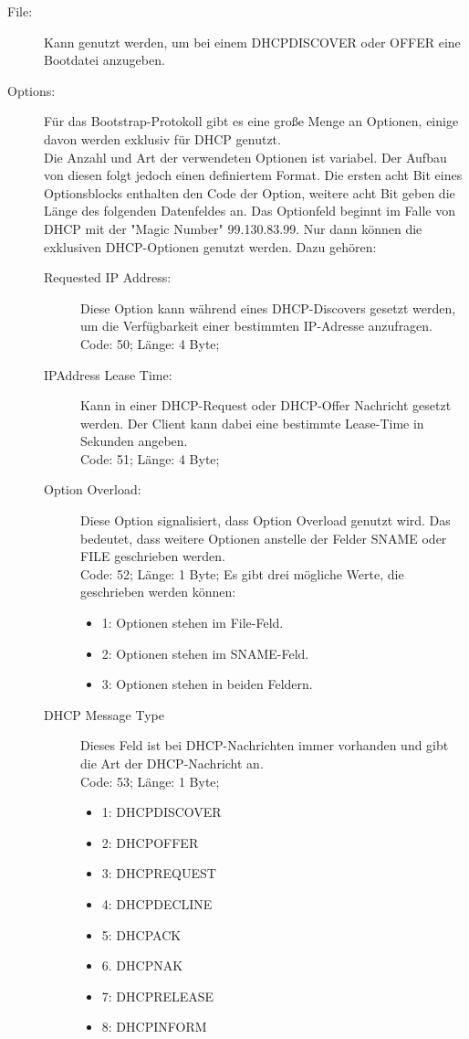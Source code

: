 \begin{description}
\item[File: ] Kann genutzt werden, um bei einem DHCPDISCOVER oder OFFER eine Bootdatei anzugeben. 
\item[Options: ] Für das Bootstrap-Protokoll gibt es eine große Menge an Optionen, einige davon werden exklusiv für DHCP genutzt. \\
Die Anzahl und Art der verwendeten Optionen ist variabel. Der Aufbau von diesen folgt jedoch einen definiertem Format. Die ersten acht Bit eines Optionsblocks enthalten den Code der Option, weitere acht Bit geben die Länge des folgenden Datenfeldes an. Das Optionfeld beginnt im Falle von DHCP mit der {}"Magic Number"{} 99.130.83.99. Nur dann können die exklusiven DHCP-Optionen genutzt werden.
Dazu gehören:
\begin{description}
	\item[Requested IP Address:] Diese Option kann während eines DHCP-Discovers gesetzt werden, um die Verfügbarkeit einer bestimmten IP-Adresse anzufragen.\\
	Code: 50; Länge: 4 Byte;
	 
	\item[IPAddress Lease Time:] Kann in einer DHCP-Request oder DHCP-Offer Nachricht gesetzt werden. Der Client kann dabei eine bestimmte Lease-Time in Sekunden angeben.\\
	Code: 51; Länge: 4 Byte;
	
	\item[Option Overload:] Diese Option signalisiert, dass Option Overload genutzt wird. Das bedeutet, dass weitere Optionen anstelle der Felder SNAME oder FILE geschrieben werden. \\
	Code: 52; Länge: 1 Byte;
	Es gibt drei mögliche Werte, die geschrieben werden können: 
	\begin{itemize}
		\item 1: Optionen stehen im File-Feld. 
		\item 2: Optionen stehen im SNAME-Feld.
		\item 3: Optionen stehen in beiden Feldern.
	\end{itemize}
	
	\item[DHCP Message Type] Dieses Feld ist bei DHCP-Nachrichten immer vorhanden und gibt die Art der DHCP-Nachricht an. \\
	Code: 53; Länge: 1 Byte;
	\begin{itemize}
		\item 1: DHCPDISCOVER
		\item 2: DHCPOFFER
		\item 3: DHCPREQUEST
		\item 4: DHCPDECLINE
		\item 5: DHCPACK
		\item 6. DHCPNAK
		\item 7: DHCPRELEASE
		\item 8: DHCPINFORM		
		

\end{itemize}
\end{description}
\end{description}
